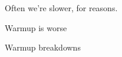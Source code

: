 		\begin{paragraph-here}
			 Often we're slower, for reasons.
		\end{paragraph-here}

		\begin{paragraph-here}
			Warmup is worse
		\end{paragraph-here}

		\begin{show-experiment}
			Warmup breakdowns
		\end{show-experiment}




